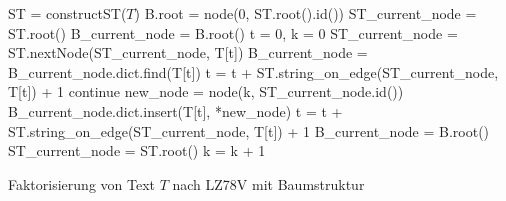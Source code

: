 \documentclass[a4paper,11pt]{scrartcl}%
\theoremstyle{change}
\theoremstyle{nonumberplain}
\theoremstyle{change}
\theoremstyle{nonumberplain}
\theoremstyle{change}
\theoremstyle{nonumberplain}
\begin{document}
		\begin{algorithm}[H]
		\begin{algorithmic}
			\STATE ST = constructST($T$) 
			\STATE B.root = node(0, ST.root().id())
			\STATE ST\_current\_node = ST.root()
			\STATE B\_current\_node = B.root()
			\STATE t = 0, k = 0 
				\STATE ST\_current\_node = ST.nextNode(ST\_current\_node, T[t]) 
					\STATE B\_current\_node = B\_current\_node.dict.find(T[t]) 
					\STATE t = t + ST.string\_on\_edge(ST\_current\_node, T[t]) + 1
					\STATE continue
				\ELSE
					\STATE new\_node = node(k, ST\_current\_node.id()) 
					\STATE B\_current\_node.dict.insert(T[t], *new\_node)
					\STATE t = t + ST.string\_on\_edge(ST\_current\_node, T[t]) + 1 
					\STATE B\_current\_node = B.root() 
					\STATE ST\_current\_node = ST.root()
					\STATE k = k + 1
				\ENDIF 
			\ENDWHILE
		
		\end{algorithmic}	
		\caption{Faktorisierung von Text $T$ nach LZ78V mit Baumstruktur}
		\label{algoLZ78V2}
		\end{algorithm}
		
\end{document}
